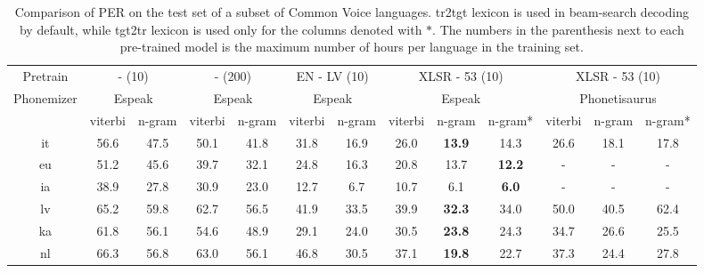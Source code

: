 \begin{table}[h!]
\caption{Comparison of PER on the test set of a subset of Common Voice languages. tr2tgt lexicon is used in beam-search decoding by default, while tgt2tr lexicon is used only for the columns denoted with $*$. The numbers in the parenthesis next to each pre-trained model is the maximum number of hours per language in the training set. \label{tab:cv_res}
}
\begin{center}
\setlength{\tabcolsep}{4.5pt}
\begin{tabular}{@{}ccccccccccccc@{}}
\toprule
 Pretrain  & \multicolumn{2}{c}{- (10)} & \multicolumn{2}{c}{- (200)} & \multicolumn{2}{c}{EN - LV (10)} & \multicolumn{3}{c}{XLSR - 53 (10)}      & \multicolumn{3}{c}{XLSR - 53 (10)} \\
 Phonemizer  & \multicolumn{2}{c}{Espeak} & \multicolumn{2}{c}{Espeak}  & \multicolumn{2}{c}{Espeak}       & \multicolumn{3}{c}{Espeak}              & \multicolumn{3}{c}{Phonetisaurus}  \\
   & viterbi      & n-gram      & viterbi       & n-gram      & viterbi         & n-gram         & viterbi & n-gram        & n-gram*       & viterbi    & n-gram    & n-gram*   \\
\cmidrule(lr){2-3} \cmidrule(lr){4-5} \cmidrule(lr){6-7} \cmidrule(lr){8-10} \cmidrule(lr){11-13}
it & 56.6         & 47.5        & 50.1          & 41.8        & 31.8            & 16.9           & 26.0    & \textbf{13.9} & 14.3          & 26.6       & 18.1      & 17.8      \\
eu & 51.2         & 45.6        & 39.7          & 32.1        & 24.8            & 16.3           & 20.8    & 13.7          & \textbf{12.2} & -          & -         & -         \\
ia & 38.9         & 27.8        & 30.9          & 23.0        & 12.7            & 6.7            & 10.7    & 6.1           & \textbf{6.0}  & -          & -         & -         \\
lv & 65.2         & 59.8        & 62.7          & 56.5        & 41.9            & 33.5           & 39.9    & \textbf{32.3} & 34.0          & 50.0       & 40.5      & 62.4      \\
ka & 61.8         & 56.1        & 54.6          & 48.9        & 29.1            & 24.0           & 30.5    & \textbf{23.8} & 24.3          & 34.7       & 26.6      & 25.5      \\
nl & 66.3         & 56.8        & 63.0          & 56.1        & 46.8            & 30.5           & 37.1    & \textbf{19.8} & 22.7          & 37.3       & 24.4      & 27.8      \\

\end{tabular}
\end{center}
\end{table}
